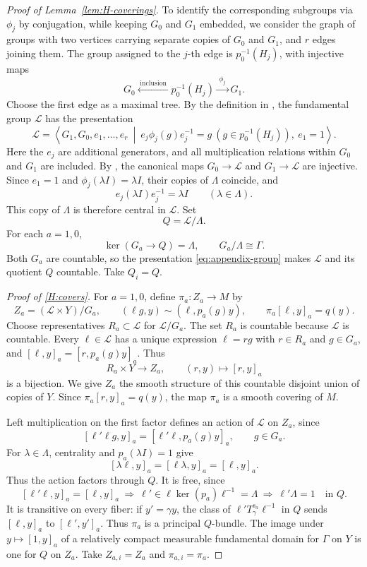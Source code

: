 \documentclass[12pt,reqno]{amsart}
\numberwithin{equation}{section}
\theoremstyle{definition}
\begin{document}
\begin{proof}[Proof of Lemma~\ref{lem:H-coverings}]
To identify the corresponding subgroups via $\phi_j$ by conjugation,
while keeping $G_0$ and $G_1$ embedded, we consider the graph of groups with two vertices carrying separate
copies of $G_0$ and $G_1$,  and $r$ edges joining
them.  The group assigned to the $j$-th edge is $p_0^{-1}(H_j)$,
with injective maps
\[
 G_0 \xleftarrow{\;\mathrm{inclusion}\;} p_0^{-1}(H_j)
 \xrightarrow{\;\phi_j\;} G_1.
\]
Choose the first edge as a maximal tree.  By the definition in
\cite[Chapter~I, \S5.1]{SerreTrees}, the fundamental group
$\mathcal L$ has the presentation
\begin{equation}\label{eq:appendix-group}
 \mathcal L=\left\langle G_1,G_0,e_1,\ldots,e_r\ \middle|\
 e_j\phi_j(g)e_j^{-1}=g\ (g\in p_0^{-1}(H_j)),\
 e_1=1\right\rangle.
\end{equation}
Here the $e_j$ are additional generators, and all multiplication
relations within $G_0$ and $G_1$ are included.
By \cite[Chapter~I, \S5.2, Theorem~11 and Corollary~3]{SerreTrees},
the canonical maps $G_0\to\mathcal L$ and $G_1\to\mathcal L$
are injective.
Since $e_1=1$ and $\phi_j(\lambda I)=\lambda I$, their copies of
$\Lambda$ coincide, and
\[
 e_j(\lambda I)e_j^{-1}=\lambda I
 \qquad(\lambda\in\Lambda).
\]
This copy of $\Lambda$ is therefore central in $\mathcal L$. Set
\[
 Q=\mathcal L/\Lambda.
\]
For each $a=1,0$,
\[
 \ker(G_a\longrightarrow Q)=\Lambda,\qquad G_a/\Lambda\cong\Gamma.
\]
Both $G_a$ are countable, so the presentation
\eqref{eq:appendix-group} makes $\mathcal L$ and its quotient $Q$
countable. Take $Q_i=Q$.

\emph{Proof of \ref{H:covers}.}
For $a=1,0$, define $\pi_a:Z_a\to M$ by
\[
 Z_a=(\mathcal L\times Y)/G_a,\qquad
 (\ell g,y)\sim(\ell,p_a(g)y),\qquad
 \pi_a[\ell,y]_a=q(y).
\]
Choose representatives $R_a\subset\mathcal L$ for $\mathcal L/G_a$.
The set $R_a$ is countable because $\mathcal L$ is countable.
Every $\ell\in\mathcal L$ has a unique expression $\ell=rg$ with
$r\in R_a$ and $g\in G_a$, and $[\ell,y]_a=[r,p_a(g)y]_a$. Thus
\[
 R_a\times Y\longrightarrow Z_a,\qquad
 (r,y)\longmapsto[r,y]_a
\]
is a bijection.  We give $Z_a$ the smooth structure of this countable
disjoint union of copies of $Y$.  Since
$\pi_a[r,y]_a=q(y)$, the map $\pi_a$ is a smooth covering of $M$.

Left multiplication on the first factor defines an action of
$\mathcal L$ on $Z_a$, since
\[
 [\ell'\ell g,y]_a=[\ell'\ell,p_a(g)y]_a,
 \qquad g\in G_a.
\]
For $\lambda\in\Lambda$, centrality and $p_a(\lambda I)=1$ give
\[
 [\lambda\ell,y]_a=[\ell\lambda,y]_a=[\ell,y]_a.
\]
Thus the action factors through $Q$.  It is free, since
\[
 [\ell'\ell,y]_a=[\ell,y]_a
 \ \Longrightarrow\
 \ell'\in\ell\ker(p_a)\ell^{-1}=\Lambda
 \ \Longrightarrow\ \ell'\Lambda=1\quad\text{in }Q.
\]
It is transitive on every fiber: if $y'=\gamma y$, the class of
$\ell'T^{s_a}_\gamma\ell^{-1}$ in $Q$ sends $[\ell,y]_a$ to
$[\ell',y']_a$. Thus $\pi_a$ is a principal
$Q$-bundle. The image under $y\mapsto[1,y]_a$ of a relatively compact
measurable fundamental domain for $\Gamma$ on $Y$ is one for $Q$ on
$Z_a$. Take $Z_{a,i}=Z_a$ and $\pi_{a,i}=\pi_a$.


\end{proof}
\end{document}
